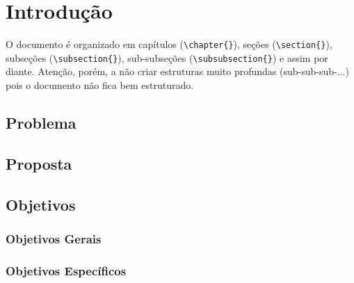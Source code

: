 \chapter{Introdução}
\label{cap-intro}

O documento é organizado em capítulos (\texttt{\textbackslash chapter\{\}}), seções (\texttt{\textbackslash section\{\}}), subseções (\texttt{\textbackslash subsection\{\}}), sub-subseções (\texttt{\textbackslash subsubsection\{\}}) e assim por diante. Atenção, porém, a não criar estruturas muito profundas (sub-sub-sub-...) pois o documento não fica bem estruturado.

\section{Problema}

\section{Proposta}

\section{Objetivos}

\subsection{Objetivos Gerais}

\subsection{Objetivos Específicos}